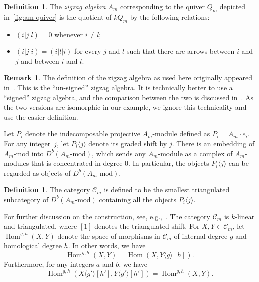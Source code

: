 \documentclass{amsart}
\theoremstyle{definition}
\newtheorem{definition}[theorem]{Definition}
\newtheorem{remark}[theorem]{Remark}
\DeclareMathOperator{\Hom}{Hom} %
\newcommand{\darkblue}{\color{darkblue}} %
\newcommand{\defn}[1]{\textsl{\darkblue #1}} %
\newcommand{\vincent}[1]{\todo[color=blue!30]{\rm #1 \\ \hfill --- V.}}
\begin{document}
\begin{definition}
  The \defn{zigzag algebra} \(A_m\) corresponding to the quiver \(Q_m\) depicted in~\cref{fig:am-quiver} is the quotient of \(kQ_m\) by the following relations:
  \begin{itemize}
  \item \((i|j|l) = 0\) whenever \(i \neq l\);
  \item \((i|j|i) = (i|l|i)\) for every \(j\) and \(l\) such that there are arrows between \(i\) and \(j\) and between \(i\) and \(l\).
  \vincent{why not write $i-1$ and~$i+1$?}
  \end{itemize}
\end{definition}

\begin{remark}
  The definition of the zigzag algebra as used here originally appeared in~\cite[Sect.~3]{hue.kho:01}.
  This is the ``un-signed'' zigzag algebra.
  It is technically better to use a ``signed'' zigzag algebra, and the comparison between the two is discussed in~\cite[Rem.~6.6]{bap.deo.lic:20}.
  As the two versions are isomorphic in our example, we ignore this technicality and use the easier definition.
\end{remark}

Let \(P_i\) denote the indecomposable projective \(A_m\)-module defined as \(P_i = A_m\cdot e_i\).
For any integer~\(j\), let \(P_i \langle j \rangle\) denote its graded shift by \(j\).
There is an embedding of \(A_m\text{-mod}\) into \(D^b(A_m\text{-mod})\), which sends any \(A_m\)-module as a complex of \(A_m\)-modules that is concentrated in degree \(0\).
In particular, the objects \(P_i\langle j \rangle\) can be regarded as objects of \(D^b(A_m\text{-mod})\).
\begin{definition}
  The category \(\mathcal{C}_m\) is defined to be the smallest triangulated subcategory of \(D^b(A_m\text{-mod})\) containing all the objects \(P_i\langle j \rangle\).
\end{definition}
For further discussion on the construction, see, e.g.,~\cite[Sect.~2.3.3]{bap.deo.lic:22}.
The category \(\mathcal{C}_m\) is \(k\)-linear and triangulated, where \([1]\) denotes the triangulated shift.
For \(X, Y \in \mathcal{C}_m\), let \(\Hom^{g,h}(X,Y)\) denote the space of morphisms in \(\mathcal{C}_m\) of internal degree \(g\) and homological degree \(h\).
In other words, we have
\[\Hom^{g,h}(X,Y) = \Hom(X,Y\langle g \rangle[h]).\]
Furthermore, for any integers \(a\) and \(b\), we have
\[\Hom^{g,h}(X\langle g' \rangle[h'], Y\langle g' \rangle[h']) = \Hom^{g,h}(X,Y).\]
\end{document}
